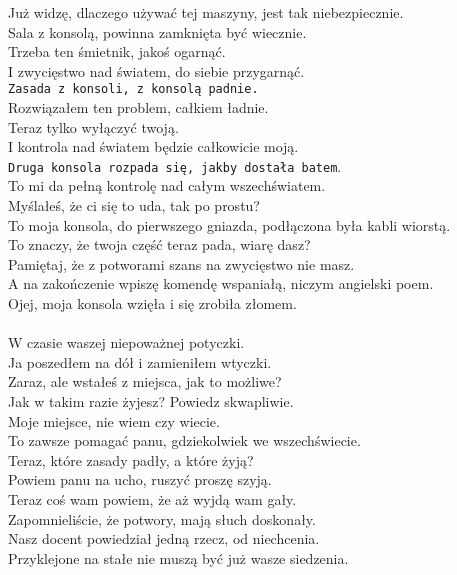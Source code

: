 \charszam{}
Już widzę, dlaczego używać tej maszyny, jest tak niebezpiecznie.\\
Sala z konsolą, powinna zamknięta być wiecznie.\\
Trzeba ten śmietnik, jakoś ogarnąć.\\
I zwycięstwo nad światem, do siebie przygarnąć.\\
\texttt{Zasada z konsoli, z konsolą padnie.}\\
Rozwiązałem ten problem, całkiem ładnie.\\
Teraz tylko wyłączyć twoją.\\
I kontrola nad światem będzie całkowicie moją.\\
\texttt{Druga konsola rozpada się, jakby dostała batem}.\\
To mi da pełną kontrolę nad całym wszechświatem.\\

\charfer{}
Myślałeś, że ci się to uda, tak po prostu?\\
To moja konsola, do pierwszego gniazda, podłączona była kabli wiorstą.\\
To znaczy, że twoja część teraz pada, wiarę dasz?\\
Pamiętaj, że z potworami szans na zwycięstwo nie masz.\\
A na zakończenie wpiszę komendę wspaniałą, niczym angielski poem.\\
Ojej, moja konsola wzięła i się zrobiła złomem.\\

\\

\chardoc{}
W czasie waszej niepoważnej potyczki.\\
Ja poszedłem na dół i zamieniłem wtyczki.\\

\charszam{}
Zaraz, ale wstałeś z miejsca, jak to możliwe?\\
Jak w takim razie żyjesz? Powiedz skwapliwie.\\

\chardoc{}
Moje miejsce, nie wiem czy wiecie.\\
To zawsze pomagać panu, gdziekolwiek we wszechświecie.\\
Teraz, które zasady padły, a które żyją?\\
Powiem panu na ucho, ruszyć proszę szyją.\\

\charfer{}
Teraz coś wam powiem, że aż wyjdą wam gały.\\
Zapomnieliście, że potwory, mają słuch doskonały.\\
Nasz docent powiedział jedną rzecz, od niechcenia.\\
Przyklejone na stałe nie muszą być już wasze siedzenia.\\

